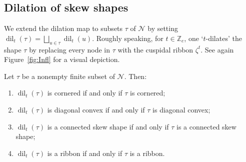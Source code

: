\documentclass[Unicode,ALCO]{cedram}
\newcommand{\infl}{\operatorname{dil}}
\newcommand{\N}{\mathcal{N}}
\newcommand{\0}{{\bar 0}}
\newcommand{\ZZ}{{\mathbb Z}}
\begin{document}
\subsection{Dilation of skew shapes}\label{dilskew}
We extend the dilation map to subsets \(\tau\) of \(\N\) by setting
\(
\infl_t(\tau) = \bigsqcup_{u \in \tau} \infl_t(u).
\)
Roughly speaking, for \(t \in \ZZ_e\), one `\(t\)-dilates' the shape \(\tau\) by replacing every node in \(\tau\) with the cuspidal ribbon \(\zeta^{t}\). See again Figure~\ref{fig:Infl} for a visual depiction.

\begin{lemma}\label{skewtoskew}
Let \(\tau\) be a nonempty finite subset of \(\N\). Then:
\begin{enumerate}
\item \(\infl_t(\tau)\) is cornered if and only if \(\tau\) is cornered; \label{cond:skewtoskew1}
\item \(\infl_t(\tau)\) is diagonal convex if and only if \(\tau\) is diagonal convex; \label{cond:skewtoskew2}
\item \(\infl_t(\tau)\) is a connected skew shape if and only if \(\tau\) is a connected skew shape; \label{cond:skewtoskew3}
\item \(\infl_t(\tau)\) is a ribbon if and only if \(\tau\) is a ribbon. \label{cond:skewtoskew4}
\end{enumerate}
\end{lemma}
\end{document}

